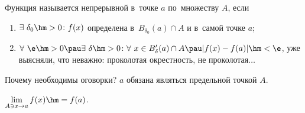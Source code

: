 
Функция называется непрерывной в~точке $a$ по~множеству $A$, если

\begin{enumerate}
    \item $\exists\  \delta_0\hm>0\colon f(x)$ определена в~$B_{\delta_0}(a)\cap A$ и
        в~самой точке $a$;

    \item $\forall\ \e\hm>0\pau\exists\ \delta\hm>0\colon \forall\  x\in B'_{\delta}(a)\cap A \pau |f(x)-f(a)|\hm<\e$, уже выясняли, что неважно: проколотая окрестность, не проколотая$\ldots$
\end{enumerate}

Почему необходимы оговорки? $a$ обязана являться предельной точкой $A$.

$\lim\limits_{A\ni x\to a}f(x)\hm=f(a)$.
